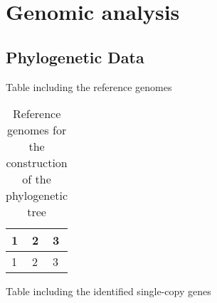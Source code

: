 
\section{Genomic analysis} %
\label{sec:genomic_analysis}

	\subsection{Phylogenetic Data}
	
	Table including the reference genomes
	
	\begin{table}[htbp]
		\caption{Reference genomes for the construction of the phylogenetic tree}
		\label{tab:ref_genomes}
		\centering
		\begin{tabularx}{\textwidth}{XXX}
			\toprule
			\textbf{1} 			& \textbf{2}		& \textbf{3}		\\
			\midrule
			1	&	2	& 3 \\
			\bottomrule
		\end{tabularx}
	\end{table}

	Table including the identified single-copy genes
	
